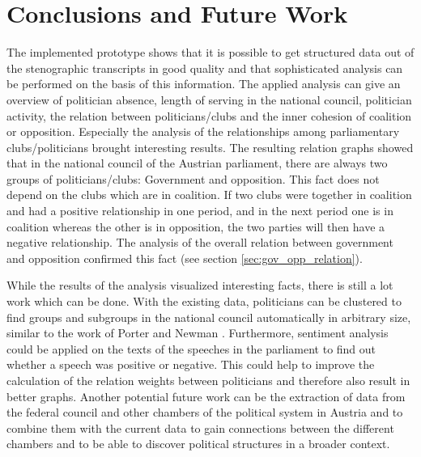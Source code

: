 

\chapter{Conclusions and Future Work}
\label{chap:conclusion}

The implemented prototype shows that it is possible to get structured data out of the stenographic transcripts in good quality and that sophisticated analysis can be performed on the basis of this information. The applied analysis can give an overview of politician absence, length of serving in the national council, politician activity, the relation between politicians/clubs and the inner cohesion of coalition or opposition. Especially the analysis of the relationships among parliamentary clubs/politicians brought interesting results. The resulting relation graphs showed that in the national council of the Austrian parliament, there are always two groups of politicians/clubs: Government and opposition. This fact does not depend on the clubs which are in coalition. If two clubs were together in coalition and had a positive relationship in one period, and in the next period one is in coalition whereas the other is in opposition, the two parties will then have a negative relationship. The analysis of the overall relation between government and opposition confirmed this fact (see section \ref{sec:gov_opp_relation}).

While the results of the analysis visualized interesting facts, there is still a lot work which can be done. With the existing data, politicians can be clustered to find groups and subgroups in the national council automatically in arbitrary size, similar to the work of Porter and Newman \cite{Porter_2005}. Furthermore, sentiment analysis could be applied on the texts of the speeches in the parliament to find out whether a speech was positive or negative. This could help to improve the calculation of the relation weights between politicians and therefore also result in better graphs. Another potential future work can be the extraction of data from the federal council and other chambers of the political system in Austria and to combine them with the current data to gain connections between the different chambers and to be able to discover political structures in a broader context.